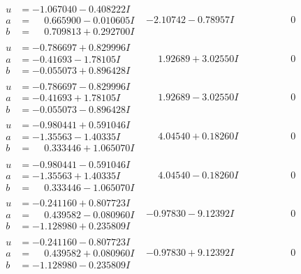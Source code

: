 \documentclass[1p]{elsarticle_modified}
\theoremstyle{definition}
\begin{document}
$$\begin{array}{c|c|c}
\begin{aligned}
u &= -1.067040 - 0.408222 I \\
a &= \phantom{-}0.665900 - 0.010605 I \\
b &= \phantom{-}0.709813 + 0.292700 I\end{aligned}
 & -2.10742 - 0.78957 I & \phantom{-0.000000 } 0 \\ \hline\begin{aligned}
u &= -0.786697 + 0.829996 I \\
a &= -0.41693 - 1.78105 I \\
b &= -0.055073 + 0.896428 I\end{aligned}
 & \phantom{-}1.92689 + 3.02550 I & \phantom{-0.000000 } 0 \\ \hline\begin{aligned}
u &= -0.786697 - 0.829996 I \\
a &= -0.41693 + 1.78105 I \\
b &= -0.055073 - 0.896428 I\end{aligned}
 & \phantom{-}1.92689 - 3.02550 I & \phantom{-0.000000 } 0 \\ \hline\begin{aligned}
u &= -0.980441 + 0.591046 I \\
a &= -1.35563 - 1.40335 I \\
b &= \phantom{-}0.333446 + 1.065070 I\end{aligned}
 & \phantom{-}4.04540 + 0.18260 I & \phantom{-0.000000 } 0 \\ \hline\begin{aligned}
u &= -0.980441 - 0.591046 I \\
a &= -1.35563 + 1.40335 I \\
b &= \phantom{-}0.333446 - 1.065070 I\end{aligned}
 & \phantom{-}4.04540 - 0.18260 I & \phantom{-0.000000 } 0 \\ \hline\begin{aligned}
u &= -0.241160 + 0.807723 I \\
a &= \phantom{-}0.439582 - 0.080960 I \\
b &= -1.128980 + 0.235809 I\end{aligned}
 & -0.97830 - 9.12392 I & \phantom{-0.000000 } 0 \\ \hline\begin{aligned}
u &= -0.241160 - 0.807723 I \\
a &= \phantom{-}0.439582 + 0.080960 I \\
b &= -1.128980 - 0.235809 I\end{aligned}
 & -0.97830 + 9.12392 I & \phantom{-0.000000 } 0\\

\end{array}$$
\end{document}
